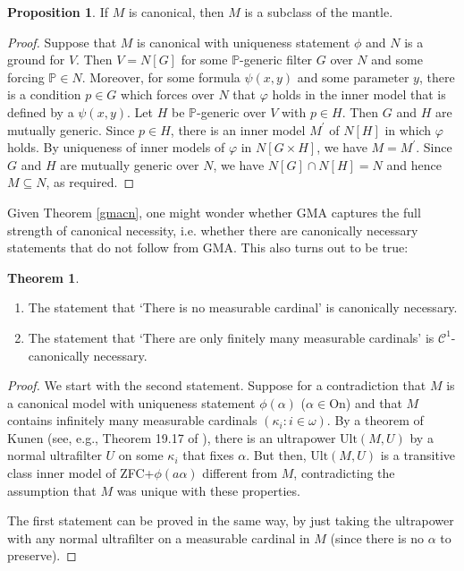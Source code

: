 \documentclass[a4paper,12pt]{amsart}
\theoremstyle{definition}
\newcommand{\PP}{\mathbb{P}}
\newtheorem{thm}[fact]{Theorem}
\newtheorem{prop}[fact]{Proposition}
\begin{document}
\begin{prop}{\label{canonical mantle}}
If $M$ is canonical, then $M$ is a subclass of the mantle.
\end{prop}
\begin{proof}
Suppose that $M$ is canonical with uniqueness statement $\phi$ and $N$ is a ground for $V$. Then $V=N[G]$ for some $\PP$-generic filter $G$ over $N$ and some forcing $\PP\in N$. Moreover, for some formula $\psi(x,y)$ and some parameter $y$, there is a condition $p\in G$ which forces over $N$ that $\varphi$ holds in the inner model that is defined by a  $\psi(x,y)$. 
Let $H$ be $\PP$-generic over $V$ with $p\in H$. Then $G$ and $H$ are mutually generic. 
Since $p\in H$, there is an inner model $M^{\prime}$ of $N[H]$ in which $\varphi$ holds. 
By uniqueness of inner models of $\varphi$ in $N[G\times H]$, we have $M=M^{\prime}$. Since $G$ and $H$ are mutually generic over $N$, we have $N[G]\cap N[H]=N$ and hence $M\subseteq N$, as required. 

\end{proof}

Given Theorem \ref{gmacn}, one might wonder whether GMA captures the full strength of canonical necessity, i.e. whether there are canonically necessary statements that do not follow from GMA. This also turns out to be true:



\begin{thm}{\label{nomeasurables}}
\begin{enumerate}
\item The statement that `There is no measurable cardinal' is canonically necessary. 
\item The statement that `There are only finitely many measurable cardinals' is $\mathcal{C}^{1}$-canonically necessary. 
\end{enumerate}
\end{thm}
\begin{proof}
We start with the second statement. 
Suppose for a contradiction that $M$ is 
a canonical model with uniqueness statement $\phi(\alpha)$ ($\alpha\in\text{On}$) and that $M$ contains infinitely many measurable cardinals $(\kappa_{i}:i\in\omega)$. By a theorem of Kunen (see, e.g., Theorem 19.17 of \cite{Kanamori}), there is an ultrapower $\text{Ult}(M,U)$ by a normal  ultrafilter $U$ on some $\kappa_{i}$ that fixes $\alpha$. 
But then, $\text{Ult}(M,U)$ is a transitive class inner model of ZFC+$\phi(a\alpha)$ different from $M$, contradicting the assumption that $M$ was unique with these properties. 

The first statement can be proved in the same way, by just taking the ultrapower with any normal ultrafilter on a measurable cardinal in $M$ (since there is no $\alpha$ to preserve). 

\end{proof}
\end{document}
